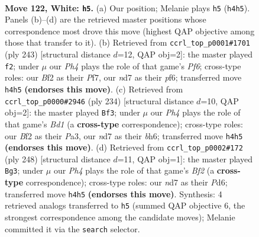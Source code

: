 \documentclass[11pt]{article}
\begin{document}
\clearpage

\begin{figure}[p]\centering
\begin{subfigure}{0.46\textwidth}\centering
\resizebox{\linewidth}{!}{%
\newchessgame
\chessboard[
  setfen={6k1/3n4/8/5P2/p6P/P7/5B2/5K2 w - - 11 122},
  showmover=false,
  pgfstyle=straightmove, color=movearrow, markmove={h4-h5}
]}
\caption{}
\end{subfigure}\hfill
\begin{subfigure}{0.46\textwidth}\centering
\resizebox{\linewidth}{!}{%
\newchessgame
\chessboard[
  setfen={4k3/5p1p/5P1P/3K4/8/5p2/8/6B1 b - - 73 122},
  showmover=false,
  pgfstyle=straightmove, color=movearrow, markmove={f3-f2}
]}
\caption{}
\end{subfigure}
\\[4pt]
\begin{subfigure}{0.46\textwidth}\centering
\resizebox{\linewidth}{!}{%
\newchessgame
\chessboard[
  setfen={8/k7/7b/8/7p/P6P/1K4P1/3B4 w - - 69 118},
  showmover=false,
  pgfstyle=straightmove, color=movearrow, markmove={d1-f3}
]}
\caption{}
\end{subfigure}\hfill
\begin{subfigure}{0.46\textwidth}\centering
\resizebox{\linewidth}{!}{%
\newchessgame
\chessboard[
  setfen={8/8/2bP4/5k1p/7P/4K3/5B2/8 w - - 3 125},
  showmover=false,
  pgfstyle=straightmove, color=movearrow, markmove={f2-g3}
]}
\caption{}
\end{subfigure}
\caption{\textbf{Move 122, White: \texttt{h5}.} (a) Our position; Melanie plays \texttt{h5} (\texttt{h4h5}). Panels (b)--(d) are the retrieved master positions whose correspondence most drove this move (highest QAP objective among those that transfer to it). (b) Retrieved from \texttt{ccrl\_top\_p0001\#1701} (ply 243) [structural distance $d$=12, QAP obj=2]: the master played \texttt{f2}; under $\mu$ our \emph{Ph4} plays the role of that game's \emph{Pf6}; cross-type roles: our \emph{B}f2 as their \emph{P}f7, our \emph{n}d7 as their \emph{p}f6; transferred move \texttt{h4h5} \textbf{(endorses this move)}. (c) Retrieved from \texttt{ccrl\_top\_p0000\#2946} (ply 234) [structural distance $d$=10, QAP obj=2]: the master played \texttt{Bf3}; under $\mu$ our \emph{Ph4} plays the role of that game's \emph{Bd1} (a \textbf{cross-type} correspondence); cross-type roles: our \emph{B}f2 as their \emph{P}a3, our \emph{n}d7 as their \emph{b}h6; transferred move \texttt{h4h5} \textbf{(endorses this move)}. (d) Retrieved from \texttt{ccrl\_top\_p0002\#172} (ply 248) [structural distance $d$=11, QAP obj=1]: the master played \texttt{Bg3}; under $\mu$ our \emph{Ph4} plays the role of that game's \emph{Bf2} (a \textbf{cross-type} correspondence); cross-type roles: our \emph{n}d7 as their \emph{P}d6; transferred move \texttt{h4h5} \textbf{(endorses this move)}. Synthesis: 4 retrieved analogs transferred to \texttt{h5} (summed QAP objective 6, the strongest correspondence among the candidate moves); Melanie committed it via the \texttt{search} selector.}
\label{fig:thought-m242}
\end{figure}
\end{document}
